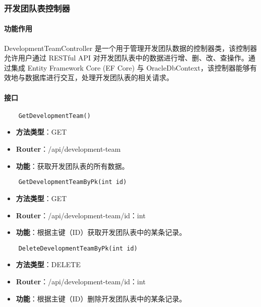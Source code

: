 \subsubsection{开发团队表控制器}

\paragraph{功能作用}

DevelopmentTeamController 是一个用于管理开发团队数据的控制器类，该控制器允许用户通过 RESTful API 对开发团队表中的数据进行增、删、改、查操作。通过集成 Entity Framework Core (EF Core) 与 OracleDbContext，该控制器能够有效地与数据库进行交互，处理开发团队表的相关请求。

\paragraph{接口}

\begin{verbatim}
	GetDevelopmentTeam()
\end{verbatim}

\begin{itemize}
	\item \textbf{方法类型}：GET
	\item \textbf{Router}：/api/development-team
	\item \textbf{功能}：获取开发团队表的所有数据。
\end{itemize}

\begin{verbatim}
	GetDevelopmentTeamByPk(int id)
\end{verbatim}

\begin{itemize}
	\item \textbf{方法类型}：GET
	\item \textbf{Router}：/api/development-team/{id：int}
	\item \textbf{功能}：根据主键（ID）获取开发团队表中的某条记录。
\end{itemize}

\begin{verbatim}
	DeleteDevelopmentTeamByPk(int id)
\end{verbatim}

\begin{itemize}
	\item \textbf{方法类型}：DELETE
	\item \textbf{Router}：/api/development-team/{id：int}
	\item \textbf{功能}：根据主键（ID）删除开发团队表中的某条记录。
\end{itemize}

